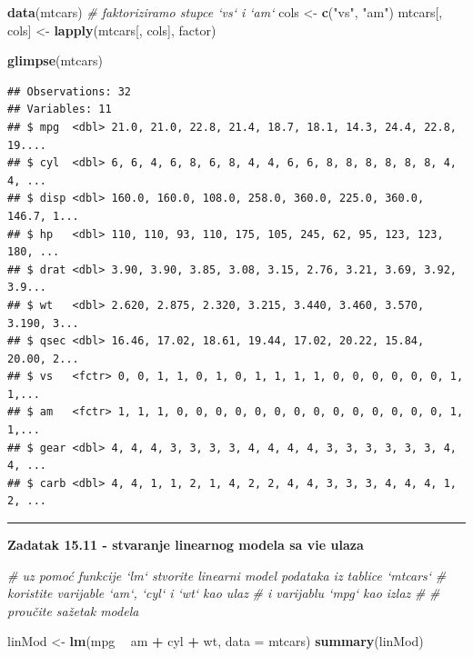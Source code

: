 \documentclass[]{book}
\newenvironment{Shaded}{\begin{snugshade}}{\end{snugshade}}
\newcommand{\KeywordTok}[1]{\textcolor[rgb]{0.13,0.29,0.53}{\textbf{#1}}}
\newcommand{\DataTypeTok}[1]{\textcolor[rgb]{0.13,0.29,0.53}{#1}}
\newcommand{\StringTok}[1]{\textcolor[rgb]{0.31,0.60,0.02}{#1}}
\newcommand{\CommentTok}[1]{\textcolor[rgb]{0.56,0.35,0.01}{\textit{#1}}}
\newcommand{\OperatorTok}[1]{\textcolor[rgb]{0.81,0.36,0.00}{\textbf{#1}}}
\newcommand{\NormalTok}[1]{#1}
\theoremstyle{definition}
\theoremstyle{definition}
\theoremstyle{definition}
\theoremstyle{remark}
\begin{document}
\begin{Shaded}
\begin{Highlighting}[]
\KeywordTok{data}\NormalTok{(mtcars)}
\CommentTok{# faktoriziramo stupce  `vs` i `am`}
\NormalTok{cols <-}\StringTok{ }\KeywordTok{c}\NormalTok{(}\StringTok{"vs"}\NormalTok{, }\StringTok{"am"}\NormalTok{)}
\NormalTok{mtcars[, cols] <-}\StringTok{ }\KeywordTok{lapply}\NormalTok{(mtcars[, cols], factor)}

\KeywordTok{glimpse}\NormalTok{(mtcars)}
\end{Highlighting}
\end{Shaded}

\begin{verbatim}
## Observations: 32
## Variables: 11
## $ mpg  <dbl> 21.0, 21.0, 22.8, 21.4, 18.7, 18.1, 14.3, 24.4, 22.8, 19....
## $ cyl  <dbl> 6, 6, 4, 6, 8, 6, 8, 4, 4, 6, 6, 8, 8, 8, 8, 8, 8, 4, 4, ...
## $ disp <dbl> 160.0, 160.0, 108.0, 258.0, 360.0, 225.0, 360.0, 146.7, 1...
## $ hp   <dbl> 110, 110, 93, 110, 175, 105, 245, 62, 95, 123, 123, 180, ...
## $ drat <dbl> 3.90, 3.90, 3.85, 3.08, 3.15, 2.76, 3.21, 3.69, 3.92, 3.9...
## $ wt   <dbl> 2.620, 2.875, 2.320, 3.215, 3.440, 3.460, 3.570, 3.190, 3...
## $ qsec <dbl> 16.46, 17.02, 18.61, 19.44, 17.02, 20.22, 15.84, 20.00, 2...
## $ vs   <fctr> 0, 0, 1, 1, 0, 1, 0, 1, 1, 1, 1, 0, 0, 0, 0, 0, 0, 1, 1,...
## $ am   <fctr> 1, 1, 1, 0, 0, 0, 0, 0, 0, 0, 0, 0, 0, 0, 0, 0, 0, 1, 1,...
## $ gear <dbl> 4, 4, 4, 3, 3, 3, 3, 4, 4, 4, 4, 3, 3, 3, 3, 3, 3, 4, 4, ...
## $ carb <dbl> 4, 4, 1, 1, 2, 1, 4, 2, 2, 4, 4, 3, 3, 3, 4, 4, 4, 1, 2, ...
\end{verbatim}

\begin{center}\rule{0.5\linewidth}{\linethickness}\end{center}

\textbf{Zadatak 15.11 - stvaranje linearnog modela sa vie ulaza}

\begin{Shaded}
\begin{Highlighting}[]
\CommentTok{# uz pomoć funkcije `lm` stvorite linearni model podataka iz tablice `mtcars`}
\CommentTok{# koristite varijable `am`,  `cyl` i `wt` kao ulaz}
\CommentTok{# i varijablu `mpg` kao izlaz}
\CommentTok{#}
\CommentTok{# proučite sažetak modela}
\end{Highlighting}
\end{Shaded}

\begin{Shaded}
\begin{Highlighting}[]
\NormalTok{linMod <-}\StringTok{ }\KeywordTok{lm}\NormalTok{(mpg }\OperatorTok{~}\StringTok{ }\NormalTok{am }\OperatorTok{+}\StringTok{ }\NormalTok{cyl }\OperatorTok{+}\StringTok{ }\NormalTok{wt, }\DataTypeTok{data =}\NormalTok{ mtcars)}
\KeywordTok{summary}\NormalTok{(linMod)}
\end{Highlighting}
\end{Shaded}
\end{document}
